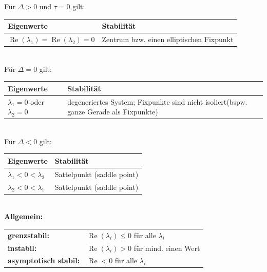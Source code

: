 Für $\Delta > 0$ und $\tau = 0$ gilt: \\
\begin{tabular}{|p{5cm}|p{13cm}|}
\hline \textbf{Eigenwerte} & \textbf{Stabilität} \\ 
\hline $\operatorname{Re}(\lambda_1) = \operatorname{Re}(\lambda_2) = 0$ & Zentrum bzw. einen elliptischen Fixpunkt\\
\hline 
\end{tabular} \\

Für $\Delta = 0$ gilt: \\
\begin{tabular}{|p{5cm}|p{13cm}|}
\hline \textbf{Eigenwerte} & \textbf{Stabilität} \\ 
\hline $\lambda_1 = 0$ oder $\lambda_2 = 0$ & degeneriertes System; Fixpunkte sind nicht isoliert(bspw. ganze Gerade als Fixpunkte) \\ 
\hline 
\end{tabular} \\

Für $\Delta < 0$ gilt: \\
\begin{tabular}{|p{5cm}|p{13cm}|}
\hline \textbf{Eigenwerte} & \textbf{Stabilität} \\ 
\hline $\lambda_1 < 0 < \lambda_2$ & Sattelpunkt (saddle point) \\
\hline $\lambda_2 < 0 < \lambda_1$ & Sattelpunkt (saddle point) \\ 
\hline 
\end{tabular} \\

\textbf{Allgemein:}\\
\begin{tabular}{ll}
	\textbf{grenzstabil:} \qquad & $\operatorname{Re}(\lambda_i) \leq 0$ für alle $\lambda_i$ \\
	\textbf{instabil:} & $\operatorname{Re}(\lambda_i) > 0$ für mind. einen Wert \\
	\textbf{asymptotisch stabil:} &$\operatorname{Re} < 0$ für alle $\lambda_i$ \\
\end{tabular}\\ \\


